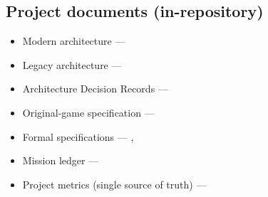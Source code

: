 \documentclass[11pt,a4paper]{article}
\begin{document}
\subsection*{Project documents (in-repository)}
\begin{itemize}[nosep]
  \item Modern architecture --- 
  \item Legacy architecture --- 
  \item Architecture Decision Records --- 
  \item Original-game specification --- 
  \item Formal specifications --- ,
  \item Mission ledger --- 
  \item Project metrics (single source of truth) ---
\end{itemize}
\end{document}
